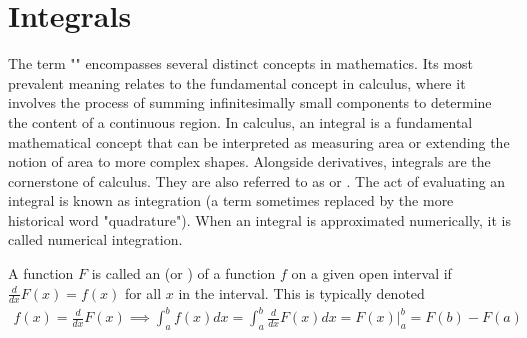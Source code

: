 \section{Integrals}

The term "" encompasses several distinct concepts in mathematics. Its most prevalent meaning relates to the fundamental concept in calculus, where it involves the process of summing infinitesimally small components to determine the content of a continuous region. In calculus, an integral is a fundamental mathematical concept that can be interpreted as measuring area or extending the notion of area to more complex shapes. Alongside derivatives, integrals are the cornerstone of calculus. They are also referred to as  or . The act of evaluating an integral is known as integration (a term sometimes replaced by the more historical word "quadrature"). When an integral is approximated numerically, it is called numerical integration.

\begin{defn}{1}
A function $F$ is called an  (or ) of a function $f$ on a given open interval if $\frac{d}{dx}F(x)=f(x)$ for all $x$ in the interval. This is typically denoted
\begin{align}
f(x)=\frac{d}{dx}F(x) \implies \int_{a}^{b} f(x)dx = \int_a^b \frac{d}{dx}F(x) dx = F(x)\Big|_{a}^{b} = F(b)-F(a)
\end{align}
\end{defn}

